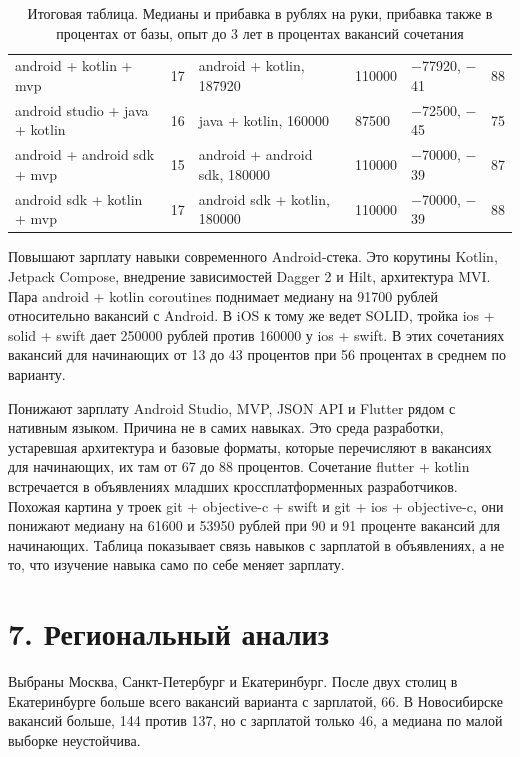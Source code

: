 \begin{table}[H]
\begin{tabular}{|L{5.4cm}|L{1.5cm}|L{4.4cm}|L{1.4cm}|L{2.0cm}|L{1.5cm}|}
android + kotlin + mvp & 17 & android + kotlin, 187920 & 110000 & $-$77920, $-$41 & 88 \\
android studio + java + kotlin & 16 & java + kotlin, 160000 & 87500 & $-$72500, $-$45 & 75 \\
android + android sdk + mvp & 15 & android + android sdk, 180000 & 110000 & $-$70000, $-$39 & 87 \\
android sdk + kotlin + mvp & 17 & android sdk + kotlin, 180000 & 110000 & $-$70000, $-$39 & 88 \\
\hline
\end{tabular}
\caption{Итоговая таблица. Медианы и прибавка в рублях на руки, прибавка также в процентах от базы, опыт до 3 лет в процентах вакансий сочетания}
\end{table}

Повышают зарплату навыки современного Android-стека. Это корутины Kotlin,
Jetpack Compose, внедрение зависимостей Dagger 2 и Hilt, архитектура MVI.
Пара android + kotlin coroutines поднимает медиану на 91700 рублей
относительно вакансий с Android. В iOS к тому же ведет SOLID, тройка ios +
solid + swift дает 250000 рублей против 160000 у ios + swift. В этих
сочетаниях вакансий для начинающих от 13 до 43 процентов при 56 процентах в
среднем по варианту.

Понижают зарплату Android Studio, MVP, JSON API и Flutter рядом с нативным
языком. Причина не в самих навыках. Это среда разработки, устаревшая
архитектура и базовые форматы, которые перечисляют в вакансиях для
начинающих, их там от 67 до 88 процентов. Сочетание flutter + kotlin
встречается в объявлениях младших кроссплатформенных разработчиков. Похожая
картина у троек git + objective-c + swift и git + ios + objective-c, они
понижают медиану на 61600 и 53950 рублей при 90 и 91 проценте вакансий для
начинающих. Таблица показывает связь навыков с зарплатой в объявлениях, а
не то, что изучение навыка само по себе меняет зарплату.

\section{7. Региональный анализ}

Выбраны Москва, Санкт-Петербург и Екатеринбург. После двух столиц в
Екатеринбурге больше всего вакансий варианта с зарплатой, 66. В Новосибирске
вакансий больше, 144 против 137, но с зарплатой только 46, а медиана по
малой выборке неустойчива.

